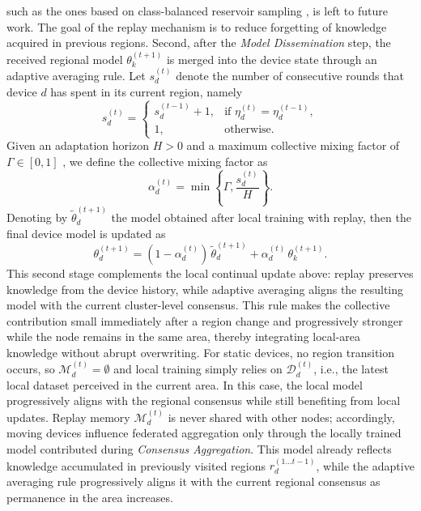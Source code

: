 \documentclass[conference]{IEEEtran}
\theoremstyle{plain}
\theoremstyle{definition}
\begin{document}
such as the ones based on class-balanced reservoir sampling \cite{pmlr-v119-chrysakis20a}, is left to future work.
The goal of the replay mechanism is to reduce forgetting of knowledge acquired in
previous regions. 
Second, after the \emph{Model Dissemination} step, 
 the received regional model $\theta_k^{(t+1)}$ is merged into the device state through an adaptive averaging rule.
Let $s_d^{(t)}$ denote the number of consecutive rounds that device $d$ has spent in its current region, namely
\[
    s_d^{(t)} =
    \begin{cases}
        s_d^{(t-1)} + 1, & \text{if } \eta_d^{(t)} = \eta_d^{(t-1)}, \\
        1, & \text{otherwise.}
    \end{cases}
\]
Given an adaptation horizon $H > 0$ and a maximum collective mixing factor of $\Gamma \in [0,1]$
, we define the collective mixing factor as
\[
    \alpha_d^{(t)} = \min\!\left\{\Gamma, \frac{s_d^{(t)}}{H}\right\}.
\]
Denoting by $\widetilde{\theta}_d^{(t+1)}$ the model obtained after local training with replay, then the final device model is updated as
\[
    \theta_d^{(t+1)} = (1 - \alpha_d^{(t)})\,\widetilde{\theta}_d^{(t+1)} + \alpha_d^{(t)}\,\theta_k^{(t+1)}.
\]
This second stage complements the local continual update above: replay preserves knowledge from the device history, while adaptive averaging aligns the resulting model with the current cluster-level consensus.
This rule makes the collective contribution small immediately after a region change and progressively stronger while the node remains in the same area, 
 thereby integrating local-area knowledge without abrupt overwriting.
%
For static devices, no region transition occurs, 
 so $\mathcal{M}_d^{(t)} = \emptyset$ and local training simply relies on $\mathcal{D}_d^{(t)}$, 
 i.e., the latest local dataset perceived in the current area. 
% 
In this case, the local model progressively aligns with the regional consensus while still benefiting from local updates.
Replay memory $\mathcal{M}_d^{(t)}$ is never shared with other nodes; 
 accordingly, moving devices influence federated aggregation only through the locally trained model contributed during \emph{Consensus Aggregation}. 
 This model already reflects knowledge accumulated in previously visited regions $r_d^{(1\ldots t-1)}$, 
 while the adaptive averaging rule progressively aligns it with the current regional consensus as permanence in the area increases.
\end{document}
